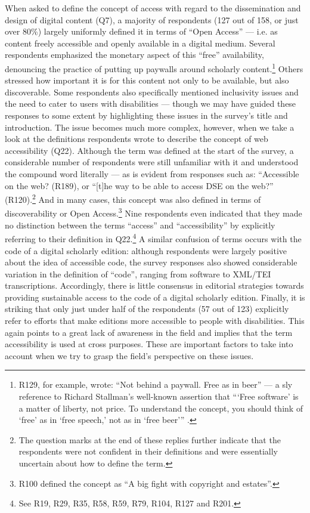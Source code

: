 \begin{paper}
When asked to define the concept of access with regard to the
dissemination and design of digital content (Q7), a majority of
respondents (127 out of 158, or just over 80\%) largely uniformly
defined it in terms of ``Open Access'' --- i.e. as content freely
accessible and openly available in a digital medium. Several respondents
emphasized the monetary aspect of this ``free'' availability, denouncing
the practice of putting up paywalls around scholarly content.\footnote{R129,
  for example, wrote: ``Not behind a paywall. Free as in beer'' --- a sly
  reference to Richard Stallman's well-known assertion that ```Free
  software' is a matter of liberty, not price. To understand the
  concept, you should think of `free' as in `free speech,' not as in
  `free beer''' \citeyearpar[3]{stallman_free_2002}.} Others stressed how important it is for
this content not only to be available, but also discoverable. Some
respondents also specifically mentioned inclusivity issues and the need
to cater to users with disabilities --- though we may have guided these
responses to some extent by highlighting these issues in the survey's
title and introduction. The issue becomes much more complex, however,
when we take a look at the definitions respondents wrote to describe the
concept of web accessibility (Q22). Although the term was defined at the
start of the survey, a considerable number of respondents were still
unfamiliar with it and understood the compound word literally --- as is
evident from responses such as: ``Accessible on the web? (R189), or
``{[}t{]}he way to be able to access DSE on the web?'' (R120).\footnote{The
  question marks at the end of these replies further indicate that the
  respondents were not confident in their definitions and were
  essentially uncertain about how to define the term.} And in many
cases, this concept was also defined in terms of discoverability or Open
Access.\footnote{R100 defined the concept as ``A big fight with
  copyright and estates''.} Nine respondents even indicated that they
made no distinction between the terms ``access'' and ``accessibility''
by explicitly referring to their definition in Q22.\footnote{See R19,
  R29, R35, R58, R59, R79, R104, R127 and R201.} A similar confusion of
terms occurs with the code of a digital scholarly edition: although
respondents were largely positive about the idea of accessible code, the
survey responses also showed considerable variation in the definition of
``code'', ranging from software to XML/TEI transcriptions. Accordingly,
there is little consensus in editorial strategies towards providing
sustainable access to the code of a digital scholarly edition. Finally,
it is striking that only just under half of the respondents (57 out of
123) explicitly refer to efforts that make editions more accessible to
people with disabilities. This again points to a great lack of awareness
in the field and implies that the term accessibility is used at cross
purposes. These are important factors to take into account when we try
to grasp the field's perspective on these issues.


\end{paper}
